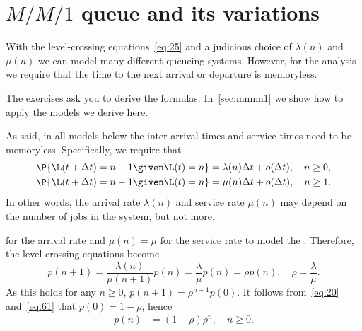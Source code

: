 

\section{$M/M/1$ queue and its variations}
\label{sec:mm1}


With the level-crossing equations~\cref{eq:25} and a judicious choice of $\lambda(n)$ and $\mu(n)$ we can model many different queueing systems.
However, for the analysis we require that the time to the next arrival or departure is memoryless.

The exercises ask you to derive the formulas. In~\cref{sec:mnmn1} we show how to apply the models we derive here.


As said, in all models below the inter-arrival times and service times need to be memoryless.
Specifically,  we require that
\begin{align*}
  \P{\L(t+\Delta t) = n+1 \given \L(t) = n } &= \lambda(n) \Delta t + o(\Delta t), \quad n\geq 0,\\
  \P{\L(t+\Delta t) = n-1 \given \L(t) = n } &= \mu(n) \Delta t + o(\Delta t), \quad n \geq 1.
\end{align*}
In other words, the arrival rate $\lambda(n)$ and service rate $\mu(n)$ may depend on the number of jobs in the system, but not more.


 for the arrival rate and $\mu(n)=\mu$ for the service rate to model the .
Therefore, the level-crossing equations become
\begin{equation*}
 p(n+1) = \frac{\lambda(n)}{\mu(n+1)} p(n) = \frac{\lambda}{\mu} p(n) = \rho p(n),\quad \rho = \frac{\lambda}{\mu}.
\end{equation*}
As this holds for any $n\geq 0$, $p(n+1) = \rho^{n+1} p(0)$.
It follows from~\cref{eq:20} and~\cref{eq:61} that $p(0) =1-\rho$, hence
\begin{align}\label{eq:23}
p(n) &= (1-\rho)\rho^{n}, \quad n \geq 0.
\end{align}

